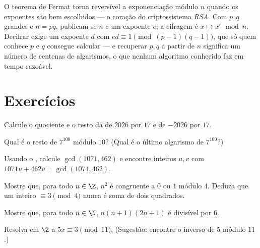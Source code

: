 \begin{example}\label{ex:g12:arith:rsa}
O teorema de Fermat torna reversível a exponenciação módulo $n$ quando os
expoentes são bem escolhidos --- o coração do criptossistema \emph{RSA}.
Com $p, q$  grandes e $n = pq$, publicam-se $n$ e um expoente $e$; a
cifragem é $x \mapsto x^e \bmod n$. Decifrar exige um expoente $d$ com
$ed \equiv 1 \pmod{(p-1)(q-1)}$, que só quem conhece $p$ e $q$ consegue
calcular --- e recuperar $p, q$ a partir de $n$ significa  um número
de centenas de algarismos, o que nenhum algoritmo conhecido faz em tempo
razoável.
\end{example}

\section{Exercícios}

\begin{exercise}[$\star$]\label{exo:g12:arith:1}
Calcule o quociente e o resto da  de $2026$ por $17$ e
de $-2026$ por $17$.
\end{exercise}

\begin{exercise}[$\star$]\label{exo:g12:arith:2}
Qual é o resto de $7^{100}$ módulo $10$? (Qual é o último algarismo de
$7^{100}$?)
\end{exercise}

\begin{exercise}[$\star$]\label{exo:g12:arith:3}
Usando o , calcule $\gcd(1071, 462)$ e encontre
inteiros $u, v$ com $1071u + 462v = \gcd(1071, 462)$.
\end{exercise}

\begin{exercise}[$\star$]\label{exo:g12:arith:4}
Mostre que, para todo $n \in \Z$, $n^2$ é congruente a $0$ ou $1$ módulo
$4$. Deduza que um inteiro $\equiv 3 \pmod 4$ nunca é soma de dois
quadrados.
\end{exercise}

\begin{exercise}[$\star\star$]\label{exo:g12:arith:5}
Mostre que, para todo $n \in \N$, $n(n+1)(2n+1)$ é divisível por $6$.
\end{exercise}

\begin{exercise}[$\star\star$]\label{exo:g12:arith:6}
Resolva em $\Z$ a  $5x \equiv 3 \pmod{11}$. (Sugestão:
encontre o inverso de $5$ módulo $11$.)
\end{exercise}

